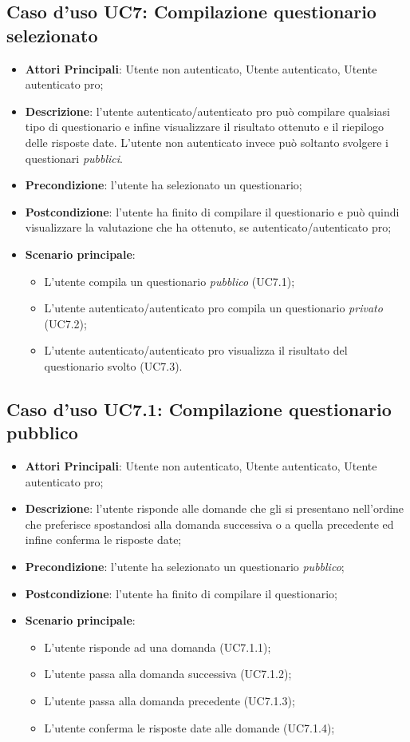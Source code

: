 \subsection{Caso d'uso UC7: Compilazione questionario selezionato}
\begin{itemize}
\item\textbf{Attori Principali}: Utente non autenticato, Utente autenticato, Utente autenticato pro;
\item\textbf{Descrizione}: l'utente autenticato/autenticato pro può compilare qualsiasi tipo di questionario e infine visualizzare il risultato ottenuto e il riepilogo delle risposte date. L'utente non autenticato invece può soltanto svolgere i questionari \textit{pubblici}.
\item\textbf{Precondizione}: l'utente ha selezionato un questionario;
\item\textbf{Postcondizione}: l'utente ha finito di compilare il questionario e può quindi visualizzare la valutazione che ha ottenuto, se autenticato/autenticato pro;
\item\textbf{Scenario principale}:
\begin{itemize}
\item L'utente compila un questionario \textit{pubblico} (UC7.1);
\item L'utente autenticato/autenticato pro compila un questionario \textit{privato} (UC7.2);
\item L'utente autenticato/autenticato pro visualizza il risultato del questionario svolto (UC7.3).
\end{itemize}
\end{itemize}

\subsection{Caso d'uso UC7.1: Compilazione questionario pubblico}
\begin{itemize}
\item\textbf{Attori Principali}: Utente non autenticato, Utente autenticato, Utente autenticato pro;
\item\textbf{Descrizione}: l'utente risponde alle domande che gli si presentano nell'ordine che preferisce spostandosi alla domanda successiva o a quella precedente ed infine conferma le risposte date;
\item\textbf{Precondizione}: l'utente ha selezionato un questionario \textit{pubblico};
\item\textbf{Postcondizione}: l'utente ha finito di compilare il questionario;
\item\textbf{Scenario principale}:
\begin{itemize}
\item L'utente risponde ad una domanda (UC7.1.1);
\item L'utente passa alla domanda successiva (UC7.1.2);
\item L'utente passa alla domanda precedente (UC7.1.3);
\item L'utente conferma le risposte date alle domande (UC7.1.4);
\end{itemize}
\end{itemize}

